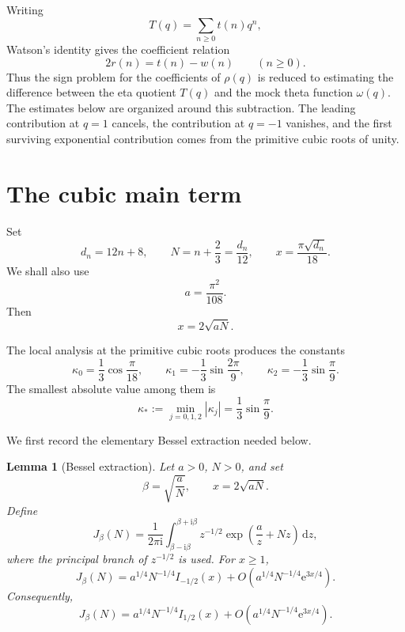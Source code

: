 \documentclass[10pt,a4paper]{amsart}
\newtheorem{lemma}[theorem]{Lemma}
\newcommand{\ii}{\mathrm i}
\newcommand{\e}{\mathrm e}
\newcommand{\dd}{\mathrm d}
\begin{document}
Writing
\[
T(q)=\sum_{n\geq0}t(n)q^n,
\]
Watson's identity gives the coefficient relation
\begin{equation}\label{eq:coeff-watson}
2r(n)=t(n)-w(n)\qquad(n\geq0).
\end{equation}
Thus the sign problem for the coefficients of $\rho(q)$ is reduced to estimating the difference between the eta quotient $T(q)$ and the mock theta function $\omega(q)$. The estimates below are organized around this subtraction. The leading contribution at $q=1$ cancels, the contribution at $q=-1$ vanishes, and the first surviving exponential contribution comes from the primitive cubic roots of unity.


\section{The cubic main term}\label{sec:cubic-main}

Set
\begin{equation}\label{eq:dnNx}
d_n=12n+8,
\qquad
N=n+\frac23=\frac{d_n}{12},
\qquad
x=\frac{\pi\sqrt{d_n}}{18}.
\end{equation}
We shall also use
\[
a=\frac{\pi^2}{108}.
\]
Then
\[
x=2\sqrt{aN}.
\]

The local analysis at the primitive cubic roots produces the constants
\begin{equation}\label{eq:kappa}
\kappa_0=\frac13\cos\frac\pi{18},
\qquad
\kappa_1=-\frac13\sin\frac{2\pi}{9},
\qquad
\kappa_2=-\frac13\sin\frac\pi9.
\end{equation}
The smallest absolute value among them is
\begin{equation}\label{eq:kappa-star}
\kappa_*:=\min_{j=0,1,2}|\kappa_j|
=
\frac13\sin\frac\pi9.
\end{equation}

We first record the elementary Bessel extraction needed below.

\begin{lemma}[Bessel extraction]\label{lem:bessel-extraction}
Let $a>0$, $N>0$, and set
\[
\beta=\sqrt{\frac{a}{N}},
\qquad
x=2\sqrt{aN}.
\]
Define
\[
J_\beta(N)
=
\frac1{2\pi\ii}
\int_{\beta-\ii\beta}^{\beta+\ii\beta}
z^{-1/2}
\exp\left(\frac{a}{z}+Nz\right)\,\dd z,
\]
where the principal branch of $z^{-1/2}$ is used. For $x\geq1$,
\begin{equation}\label{eq:J-bessel-minus}
J_\beta(N)
=
a^{1/4}N^{-1/4}I_{-1/2}(x)
+
O\left(a^{1/4}N^{-1/4}\e^{3x/4}\right).
\end{equation}
Consequently,
\begin{equation}\label{eq:J-bessel-plus}
J_\beta(N)
=
a^{1/4}N^{-1/4}I_{1/2}(x)
+
O\left(a^{1/4}N^{-1/4}\e^{3x/4}\right).
\end{equation}
\end{lemma}
\end{document}
